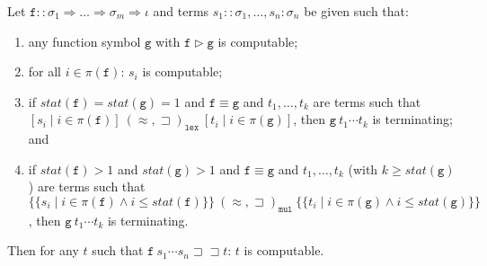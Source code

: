 \documentclass[a4paper,USenglish,cleveref,autoref,thm-restate]{lipics-v2021}
\newcommand{\arrtype}{\Rightarrow}
\newcommand{\grmain}{\sqsupset}
\newcommand{\ismain}{\approx}
\newcommand{\rpomain}{\sqsupset\!\!\sqsupset}
\newcommand{\grpred}{\rhd}
\newcommand{\eqpred}{\equiv}
\newcommand{\symb}[1]{\mathtt{#1}}
\newcommand{\afun}{\symb{f}}
\newcommand{\bfun}{\symb{g}}
\newcommand{\atype}{\sigma}
\newcommand{\asort}{\iota}
\newcommand{\status}{\mathit{stat}}
\newcommand{\filter}{\pi}
\begin{document}
\begin{lemma}\label{lem:wellfounded:induction}
Let $\afun :: \atype_1 \arrtype \dots \arrtype \atype_m \arrtype \asort$ and terms $s_1 :: \atype_1,
\dots,s_n : \atype_n$ be given such that:
\begin{enumerate}
\item any function symbol $\bfun$ with $\afun \grpred \bfun$ is computable;
\item for all $i \in \filter(\afun)$: $s_i$ is computable;
\item if $\status(\afun) = \status(\bfun) = 1$ and $\afun \eqpred \bfun$ and $t_1,\dots,
  t_k$ are terms such that $[s_i \mid i \in\filter(\afun)]\ 
  (\ismain,\grmain)_{\mathtt{lex}}\ [t_i \mid i \in \filter(\bfun)]$, then $\bfun\ t_1
  \cdots t_k$ is terminating; and
\item if $\status(\afun) > 1$ and $\status(\bfun) > 1$ and $\afun \eqpred \bfun$ and
  $t_1,\dots,t_k$ (with $k \geq \status(\bfun)$) are terms such that
  $\{\!\{s_i \mid i \in \filter(\afun) \wedge i \leq \status(\afun)\}\!\}\ 
  (\ismain,\grmain)_{\mathtt{mul}}\ 
  \{\!\{t_i \mid i \in \filter(\bfun) \wedge i \leq \status(\bfun)\}\!\}$,
  then $\bfun\ t_1 \cdots t_k$ is terminating.
\end{enumerate}
Then for any $t$ such that $\afun\ s_1 \cdots s_n \rpomain t$: $t$ is computable.
\end{lemma}
\end{document}
